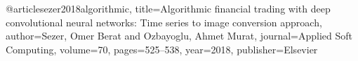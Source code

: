 @article{sezer2018algorithmic,
  title={Algorithmic financial trading with deep convolutional neural networks: Time series to image conversion approach},
  author={Sezer, Omer Berat and Ozbayoglu, Ahmet Murat},
  journal={Applied Soft Computing},
  volume={70},
  pages={525--538},
  year={2018},
  publisher={Elsevier}
}